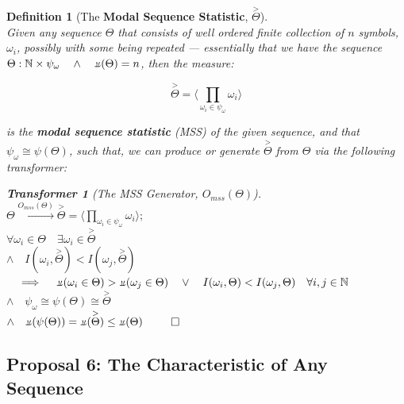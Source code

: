 \documentclass[a4paper, 18pt]{book} %
\newtheorem{defn}{Definition}
\newtheorem{transf}{Transformer}
\newcommand{\invpi}{\rotatebox[origin=c]{180}{$\pi$}}
\begin{document}
\vspace{1em}
\begin{defn}[The \textbf{Modal Sequence Statistic}, $\overset{>}{\Theta}$]
\label{DEFMSSFINb}
$ $\\
Given any sequence $\Theta$ that consists of well ordered finite collection of $n$ symbols, $\omega_i$, possibly with some being repeated --- essentially that we have the sequence $\Theta : \mathbb{N} \times \psi_{\omega} \quad \land \quad \invpi(\Theta) = n$, then the measure:

\vspace{1em}
\begin{equation}
\overset{>}{\Theta} = \langle \prod\limits_{\omega_i \in \psi_\omega} \omega_i \rangle 
\end{equation}
\vspace{1em}

is the \textbf{modal sequence statistic} (MSS) of the given sequence, and that $\psi_\omega \cong \psi(\Theta)$, such that, we can produce or generate $\overset{>}{\Theta}$ from $\Theta$ via the following transformer:

\vspace{1em}
\begin{transf}[The MSS Generator, $O_{mss}(\Theta)$]
\label{TRANSMSSGENb}
$ $\\
$\Theta \xrightarrow{O_{mss}(\Theta)} \overset{>}{\Theta} = \langle \prod\limits_{\omega_i \in \psi_\omega} \omega_i \rangle ;$\\
$\forall \omega_i \in \Theta \quad \exists \omega_i \in \overset{>}{\Theta}$\\
$\land \quad I(\omega_i,\overset{>}{\Theta}) < I(\omega_j,\overset{>}{\Theta})$\\ 
$\quad \implies \quad \invpi(\omega_i \in \Theta) > \invpi(\omega_j \in \Theta) \quad \lor \quad I(\omega_i,\Theta) < I(\omega_j, \Theta) \quad \forall i,j \in \mathbb{N}$\\
$\land \quad \psi_\omega \cong  \psi(\Theta) \cong \overset{>}{\Theta}$\\
$\land \quad \invpi(\psi(\Theta)) = \invpi(\overset{>}{\Theta}) \leq \invpi(\Theta)$
$\qed$
\end{transf}
\vspace{1em}


\end{defn}
\vspace{1em}


\subsection{Proposal 6: The Characteristic of Any Sequence\cite{lutalo_2025_trans_genetics}}
\label{PROP6}
\end{document}
